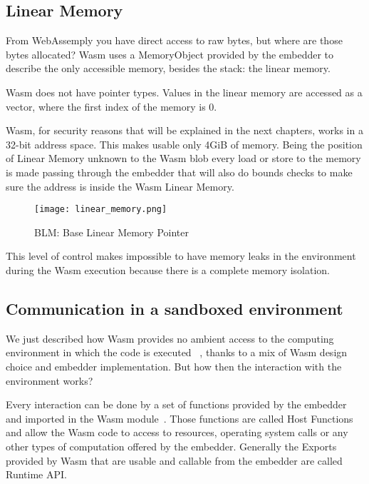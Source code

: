 \subsection{Linear Memory}

From WebAssemply you have direct access to raw bytes, but where are  those bytes allocated? Wasm uses a MemoryObject provided by the embedder to describe the only accessible memory, besides the stack: the linear memory.~\cite{linear-memory}

Wasm does not have pointer types. Values in the linear memory are accessed as a vector, where the first index of the memory is 0.

Wasm, for security reasons that will be explained in the next chapters, works in a 32-bit address space. This makes usable only 4GiB of memory. Being the position of Linear Memory unknown to the Wasm blob every load or store to the memory is made passing through the embedder that will also do bounds checks to make sure the address is inside the Wasm Linear Memory.

\begin{figure}[h]
  \centering
  \texttt{[image: linear\_memory.png]}
  \caption{BLM: Base Linear Memory Pointer}
  \label{fig:linear_memory}
\end{figure}

This level of control makes impossible to have memory leaks in the environment during the Wasm execution because there is a complete memory isolation. ~\cite{linear-memory}

\subsection{Communication in a sandboxed environment}

We just described how Wasm provides no ambient access to the computing environment in which the code is executed ~\cite{wasm-core-spec}, thanks to a mix of Wasm design choice and embedder implementation. But how  then the interaction with the environment works?

Every interaction can be done by a set of functions provided by the embedder and imported in the Wasm module~\cite{wasm-core-spec}. Those functions are called Host Functions and allow the Wasm code to access to resources, operating system calls or any other types of computation offered by the embedder. Generally the Exports provided by Wasm that are usable and callable from the embedder are called Runtime API.

